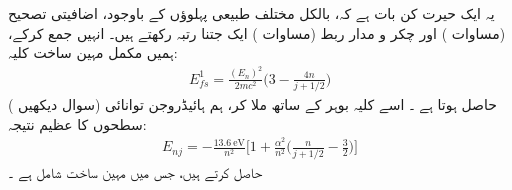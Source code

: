 یہ ایک حیرت کن بات ہے کہ،  بالکل مختلف طبیعی پہلوؤں کے باوجود،  اضافیتی تصحیح (مساوات )  اور چکر و  مدار ربط (مساوات )  ایک جتنا رتبہ  رکھتے ہیں۔ انہیں جمع کرکے،  ہمیں مکمل مہین ساخت  کلیہ:
\begin{align}\label{مساوات_غیر_مضطرب_اضافیتی_تصحیح_چکرومدار_ربط}
E_{fs}^1 = \frac{(E_n)^2}{2mc^2} \big ( 3 - \frac{4n}{j + 1/2} \big )
\end{align}
 ( سوال  دیکھیں)   حاصل ہوتا ہے ۔ اسے  کلیہ بوہر کے ساتھ ملا  کر،  ہم ہائیڈروجن  توانائی سطحوں کا عظیم نتیجہ:
\begin{align}\label{مساوات_غیر_مضطرب_مجموعی_نتیجہ_مہین}
E_{nj} = - \frac{\SI{13.6}{\electronvolt}}{n^2} \big [ 1 + \frac{\alpha^2}{n^2} \big ( \frac{n}{j + 1/2} - \frac{3}{2} \big ) \big ]
\end{align}
حاصل کرتے ہیں، جس میں مہین ساخت شامل ہے ۔ 

